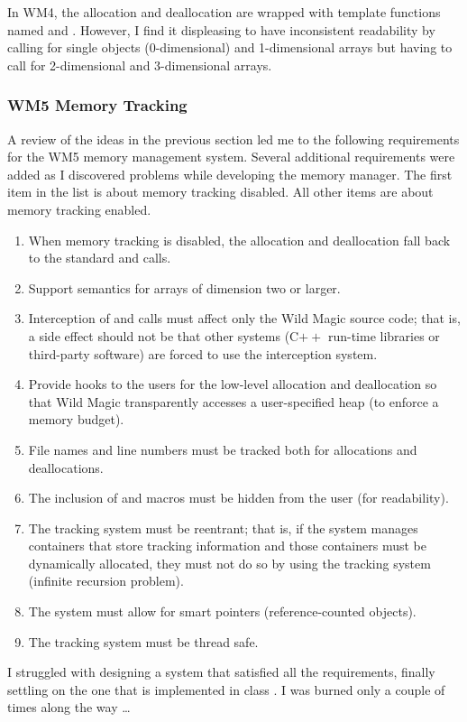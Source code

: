 \documentclass{article}
\begin{document}
In WM4, the allocation and deallocation are wrapped with template functions
named  and .  However, I find
it displeasing to have inconsistent readability by calling 
for single objects (0-dimensional) and 1-dimensional arrays but having to
call  for 2-dimensional and 3-dimensional arrays.

\subsubsection{WM5 Memory Tracking}

A review of the ideas in the previous section led me to the following
requirements for the WM5 memory management system.  Several additional
requirements were added as I discovered problems while developing the
memory manager.  The first item in the list is about memory tracking
disabled.  All other items are about memory tracking enabled.
\begin{enumerate}
  \item When memory tracking is disabled, the allocation and deallocation
    fall back to the standard  and  calls.
  \item Support semantics for arrays of dimension two or larger.
  \item Interception of  and  calls must affect
    only the Wild Magic source code; that is, a side effect should not
    be that other systems (C$++$ run-time libraries or third-party
    software) are forced to use the interception system.
  \item Provide hooks to the users for the low-level allocation and
    deallocation so that Wild Magic transparently accesses a user-specified
    heap (to enforce a memory budget).
  \item File names and line numbers must be tracked both for allocations
    and deallocations.
  \item The inclusion of  and 
    macros must be hidden from the user (for readability).
  \item The tracking system must be reentrant; that is, if the system
    manages containers that store tracking information and those
    containers must be dynamically allocated, they must not do so by
    using the tracking system (infinite recursion problem).
  \item The system must allow for smart pointers (reference-counted
    objects).
  \item The tracking system must be thread safe.
\end{enumerate}
I struggled with designing a system that satisfied all the requirements,
finally settling on the one that is implemented in class .
I was burned only a couple of times along the way \ldots
\end{document}
